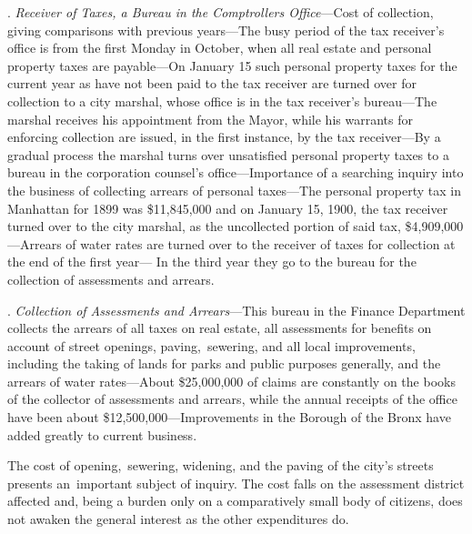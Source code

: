 \documentclass[twoside,symmetric,nobib,justified]{tufte-book}
\begin{document}
\vspace{.15in}

. \emph{Receiver of Taxes, a Bureau in the
Comptroller\textquotesingle s Office}---Cost of collection, giving
comparisons with previous years---The busy period of the tax receiver's
office is from the first Monday in October, when all real estate and
personal property taxes are payable---On January 15 such personal
property taxes for the current year as have not been paid to the tax
receiver are turned over for collection to a city marshal, whose office
is in the tax receiver's bureau---The marshal receives his appointment
from the Mayor, while his warrants for enforcing collection are issued,
in the first instance, by the tax receiver---By a gradual process the
marshal turns over unsatisfied personal property taxes to a bureau in
the corporation counsel's office---Importance of a searching inquiry
into the business of collecting arrears of personal taxes---The personal
property tax in Manhattan for 1899 was \$11,845,000 and on January 15,
1900, the tax receiver turned over to the city marshal, as the
uncollected portion of said tax, \$4,909,000---Arrears of water rates
are turned over to the receiver of taxes for collection at the end of
the first year--- In the third year they go to the bureau for the
collection of assessments and arrears.~

\vspace{.15in}

. \emph{Collection of Assessments and Arrears}---This bureau in the
Finance Department collects the arrears of all taxes on real estate, all
assessments for benefits on account of street openings,
paving,~sewering, and all local improvements, including the taking of
lands for parks and public purposes generally, and the arrears of water
rates---About \$25,000,000 of claims are constantly on the books of the
collector of assessments and arrears, while the annual receipts of the
office have been about \$12,500,000---Improvements in the Borough of the
Bronx have added greatly to current business.~

The cost of opening,~sewering, widening, and the paving of the city's
streets presents an~important subject of inquiry. The cost falls on the
assessment district affected and, being a burden only on a comparatively
small body of citizens, does not awaken the general interest as the
other expenditures do.~

\vspace{.15in}
\end{document}
